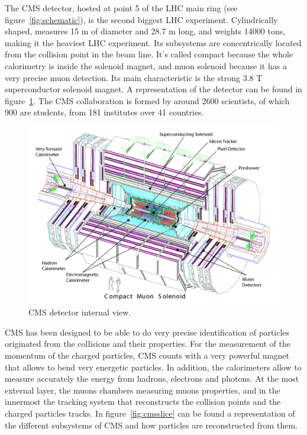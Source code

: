 The CMS detector, hosted at point 5 of the LHC main ring (see figure~\ref{fig:schematic}), is the second biggest LHC experiment. Cylindrically shaped, measures 15 m of diameter and 28.7 m long, and weights 14000 tons, making it the heaviest LHC experiment. Its subsystems are concentrically located from the collision point in the beam line. It's called compact because the whole calorimetry is inside the solenoid magnet, and muon solenoid because it has a very precise muon detection. Its main characteristic is the strong 3.8 T superconductor solenoid magnet. A representation of the detector can be found in figure~\ref{fig:cmsdet}. The CMS collaboration is formed by around 2600 scientists, of which 900 are students, from 181 institutes over 41 countries. 

\begin{figure}[!Hhtbp]
  \begin{center}
    \includegraphics[width=\textwidth]{figs/CMS_det.pdf}
    \caption{CMS detector internal view. }
    \label{fig:cmsdet}
  \end{center}
\end{figure}

CMS has been designed to be able to do very precise identification of particles originated from the collisions and their properties. For the measurement of the momentum of the charged particles, CMS counts with a very powerful magnet that allows to bend very energetic particles. In addition, the calorimeters allow to measure accurately the energy from hadrons, electrons and photons. At the most external layer, the muons chambers measuring muons properties, and in the innermost the tracking system that reconstructs the collision points and the charged particles tracks. In figure~\ref{fig:cmsslice} can be found a representation of the different subsystems of CMS and how particles are reconstructed from them.

